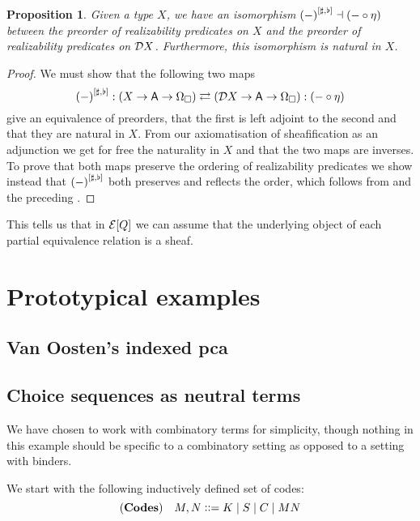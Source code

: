 \documentclass[11pt]{article}
\newtheorem{prop}[thrm]{Proposition}
\begin{document}
\begin{prop}
  Given a type \(X\), we have an isomorphism
  \({(-)}^{[{\sharp,\flat}]} \dashv (-\circ\eta)\)
  between the preorder of realizability predicates on \(X\)
  and the preorder of realizability predicates on \(\mathcal{D}{X}\).
  Furthermore, this isomorphism is natural in \(X\).
\end{prop}
\begin{proof}
  We must show that the following two maps
  \[
    {(-)}^{[{\sharp,\flat}]} : {({{X}\to{{{\ensuremath{\mathsf{A}}}\to{\Omega_\Box}}}})} \rightleftarrows {({{\mathcal{D}{X}}\to{{{\ensuremath{\mathsf{A}}}\to{\Omega_\Box}}}})} : (-\circ\eta)
  \]
  give an equivalence of preorders, that the first is left adjoint to the
  second and that they are natural in \(X\).
  From our axiomatisation of sheafification as an adjunction we get
  for free the naturality in \(X\) and that the two maps are inverses.
  To prove that both maps preserve the ordering of realizability predicates
  we show instead that \({(-)}^{[{\sharp,\flat}]}\) both preserves and reflects the order,
  which follows from  and
  the preceding .
\end{proof}

This tells us that in \({\mathcal{E}}[{Q}]\) we can assume that the underlying
object of each partial equivalence relation is a sheaf.

\newpage

\section{Prototypical examples}

\subsection{Van Oosten's indexed pca}

\subsection{Choice sequences as neutral terms}

We have chosen to work with combinatory terms for simplicity, though
nothing in this example should be specific to a combinatory setting
as opposed to a setting with binders.

We start with the following inductively defined set of codes:
%
\[
  (\textbf{Codes}) \quad
  M,N\vcentcolon\vcentcolon=
  K \mid
  S \mid
  C \mid
  M N
\]
\end{document}
